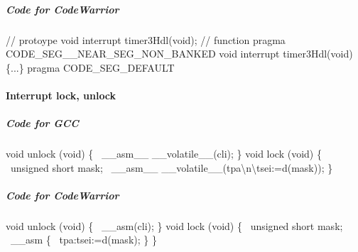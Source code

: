 \documentclass[12pt,twoside]{article}
\begin{document}
\subparagraph{Code for CodeWarrior}
{\ttfamily
 // protoype\newline
 void interrupt timer3Hdl(void);\newline
 // function\newline
 pragma CODE\_SEG\_\_NEAR\_SEG\_NON\_BANKED\newline
 void interrupt timer3Hdl(void)\newline
 \{...\}\newline
 pragma CODE\_SEG\_DEFAULT}

\paragraph{Interrupt lock, unlock}
\subparagraph{Code for GCC}
{\ttfamily
 void unlock (void)\newline
 \{\newline
  \ \_\_asm\_\_
\_\_volatile\_\_({\textquotedbl}cli{\textquotedbl});\newline
 \}\newline
 void lock (void)\newline
 \{\newline
  \ unsigned short mask;\newline
  \ \_\_asm\_\_
\_\_volatile\_\_({\textquotedbl}tpa{\textbackslash}n{\textbackslash}tsei{\textquotedbl}:{\textquotedbl}=d{\textquotedbl}(mask));\newline
 \}}

\subparagraph{Code for CodeWarrior}
{\ttfamily
void unlock (void)\newline
 \{\newline
  \ \_\_asm({\textquotedbl}cli{\textquotedbl});\newline
 \}\newline
 void lock (void)\newline
 \{\newline
  \ unsigned short mask;\newline
  \ \_\_asm\newline
  \{\newline
  \ tpa:tsei:{\textquotedbl}=d{\textquotedbl}(mask);\newline
  \}\newline
 \}}
\end{document}
